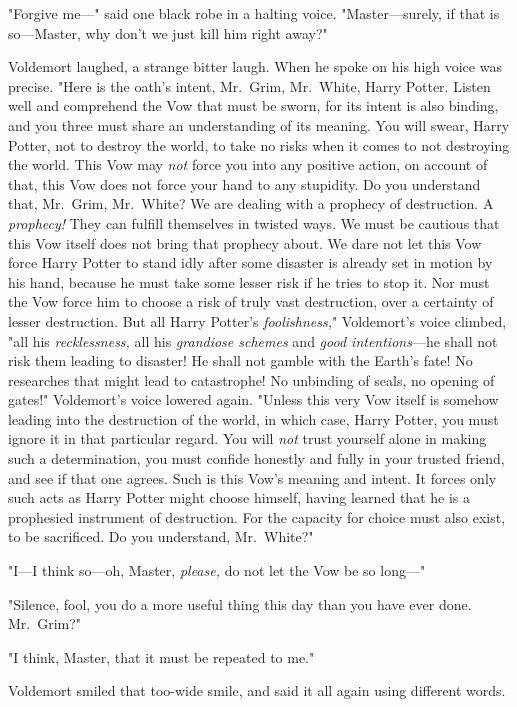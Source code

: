 "Forgive me\mbox{---}" said one black robe in a halting voice. "Mas\-ter---surely, if
that is so---Master, why don't we just kill him right away?"

Voldemort laughed, a strange bitter laugh. When he spoke on his high voice was
precise. "Here is the oath's intent, Mr.~Grim, Mr.~White, Harry Potter. Listen
well and comprehend the Vow that must be sworn, for its intent is also binding,
and you three must share an understanding of its meaning. You will swear, Harry
Potter, not to destroy the world, to take no risks when it comes to not
destroying the world. This Vow may \emph{not} force you into any positive
action, on account of that, this Vow does not force your hand to any stupidity.
Do you understand that, Mr.~Grim, Mr.~White? We are dealing with a prophecy of
destruction. A \emph{prophecy!} They can fulfill themselves in twisted ways. We
must be cautious that this Vow itself does not bring that prophecy about. We
dare not let this Vow force Harry Potter to stand idly after some disaster is
already set in motion by his hand, because he must take some lesser risk if he
tries to stop it. Nor must the Vow force him to choose a risk of truly vast
destruction, over a certainty of lesser destruction. But all Harry Potter's
\emph{foolishness,}" Voldemort's voice climbed, "all his \emph{recklessness,}
all his \emph{grandiose schemes} and \emph{good intentions}---he shall not risk
them leading to disaster! He shall not gamble with the Earth's fate! No
researches that might lead to catastrophe! No unbinding of seals, no opening of
gates!" Voldemort's voice lowered again. "Unless this very Vow itself is
somehow leading into the destruction of the world, in which case, Harry Potter,
you must ignore it in that particular regard. You will \emph{not} trust
yourself alone in making such a determination, you must confide honestly and
fully in your trusted friend, and see if that one agrees. Such is this Vow's
meaning and intent. It forces only such acts as Harry Potter might choose
himself, having learned that he is a prophesied instrument of destruction. For
the capacity for choice must also exist, to be sacrificed. Do you understand,
Mr.~White?"

"I---I think so---oh, Master, \emph{please,} do not let the Vow be so long\mbox{---}"

"Silence, fool, you do a more useful thing this day than you have ever done.
Mr.~Grim?"

"I think, Master, that it must be repeated to me."

Voldemort smiled that too-wide smile, and said it all again using different
words.

